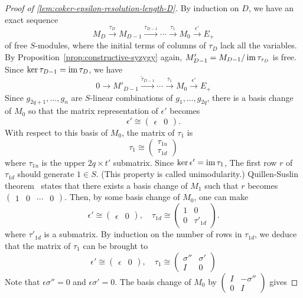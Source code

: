 \begin{proof}[Proof of \ref{lem:coker-epsilon-resolution-length-D}]
By induction on $D$, we have an exact sequence
\[
 M_{D} \xrightarrow{\tau_D} M_{D-1} \xrightarrow{\tau_{D-1}}
 \cdots \xrightarrow{\tau_1} M_0 \xrightarrow{\epsilon'} E_+ 
\]
of free $S$-modules, where the initial terms of columns of $\tau_D$ lack all the variables.
By Proposition~\ref{prop:constructive-syzygy} again, $M'_{D-1} = M_{D-1} / \mathop{\mathrm{im}}\nolimits \tau_{\tau_D}$ is free.
Since $\ker \tau_{D-1} = \mathop{\mathrm{im}}\nolimits \tau_D$, we have
\[
 0 \to M'_{D-1} \xrightarrow{\tilde \tau_{D-1}}
 \cdots \xrightarrow{\tau_1} M_0 \xrightarrow{\epsilon'} E_+ 
\]
Since $g_{2q+1},\ldots,g_n$ are $S$-linear combinations of $g_1,\ldots, g_{2q}$,
there is a basis change of $M_0$ so that the matrix representation of $\epsilon'$ becomes
\[
 \epsilon' \cong
\begin{pmatrix}
 \epsilon & 0
\end{pmatrix} .
\]
With respect to this basis of $M_0$,
the matrix of $\tau_1$ is
\[
 \tau_1 \cong
\begin{pmatrix}
 \tau_{1u} \\
 \tau_{1d}
\end{pmatrix}
\]
where $\tau_{1u}$ is the upper $2q \times t'$ submatrix.
Since $\ker \epsilon' = \mathop{\mathrm{im}}\nolimits \tau_1$, 
The first row $r$ of $\tau_{1d}$ should generate $1 \in S$.
(This property is called unimodularity.)
Quillen-Suslin theorem~\cite[Chapter~XXI Theorem~3.5]{Lang}
states that there exists a basis change of $M_1$
such that $r$ becomes $\begin{pmatrix}1 & 0 & \cdots & 0 \end{pmatrix}$.
Then, by some basis change of $M_0$, one can make 
\[
\epsilon' \cong
\begin{pmatrix}
 \epsilon & 0
\end{pmatrix} ,
\quad
 \tau_{1d} \cong
\begin{pmatrix}
 1 & 0 \\
 0 & \tau'_{1d}
\end{pmatrix} .
\]
where $\tau'_{1d}$ is a submatrix.
By induction on the number of rows in $\tau_{1d}$,
we deduce that the matrix of $\tau_1$ can be brought to
\[
\epsilon' \cong
\begin{pmatrix}
 \epsilon & 0
\end{pmatrix} ,
\quad
 \tau_1 \cong
\begin{pmatrix}
 \sigma'' & \sigma' \\
 I & 0
\end{pmatrix}
\]
Note that $\epsilon \sigma'' = 0$ and $\epsilon \sigma' = 0$.
The basis change of $M_0$ by $\begin{pmatrix} I & -\sigma'' \\ 0 & I \end{pmatrix}$ gives

\end{proof}
